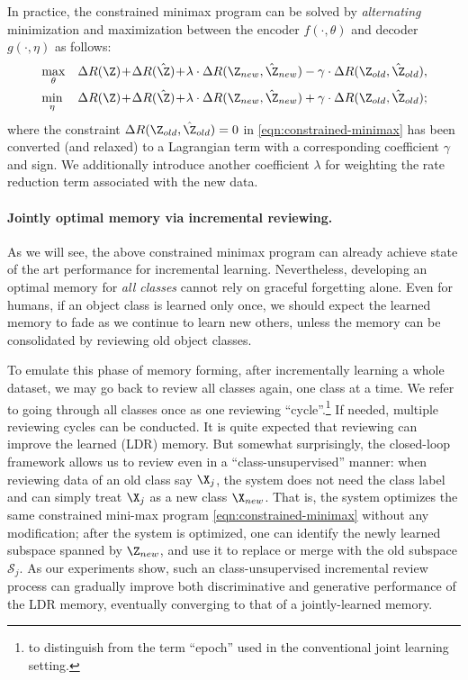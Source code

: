 \documentclass[../../book-main.tex]{subfiles}
\begin{document}
In practice, the constrained minimax program can be solved by {\em alternating}  minimization and maximization between the encoder $f(\cdot, \theta)$ and decoder $g(\cdot, \eta)$ as follows:
\begin{eqnarray}
&\max_\theta  &\Delta{R(\Z)}\!+\!\Delta{R(\hat{\Z})}\!+\!\lambda\cdot  \Delta{R(\Z_{new},\hat{\Z}_{new})} - \gamma\cdot \Delta{R(\Z_{old},\hat{\Z}_{old})}, \label{eqn:relaxed-max}\\ 
&\min_\eta &\Delta{R(\Z)}\!+\!\Delta{R(\hat{\Z})}\!+\!\lambda\cdot \Delta{R(\Z_{new},\hat{\Z}_{new})} + \gamma\cdot \Delta{R(\Z_{old},\hat{\Z}_{old})}; \label{eqn:relaxed-min}
\end{eqnarray}
where the constraint $\Delta R(\Z_{old},\hat{\Z}_{old}) = 0$ in \eqref{eqn:constrained-minimax} has been converted (and relaxed) to a Lagrangian term with a corresponding coefficient $\gamma$ and sign. We additionally introduce another coefficient $\lambda$ for weighting the rate reduction term associated with the new data. %



\paragraph{Jointly optimal memory via incremental reviewing.} 
As we will see, the above constrained minimax program can already achieve state of the art performance for incremental learning. Nevertheless, developing an optimal memory for {\em all classes} cannot rely on graceful forgetting alone. Even for humans, if an object class is learned only once, we should expect the learned memory to fade as we continue to learn new others, unless the memory can be consolidated by reviewing old object classes. %

To emulate this phase of memory forming, after incrementally learning a whole dataset, we may go back to review all classes again, one class at a time. We refer to going through all classes once as one reviewing ``cycle''.\footnote{to distinguish from the term ``epoch'' used in the conventional joint learning setting.} If needed, multiple reviewing cycles can be conducted. It is quite expected that reviewing can improve the learned (LDR) memory. But somewhat surprisingly, the closed-loop framework allows us to review even in a ``{class-unsupervised}'' manner: when reviewing data of an old class say $\X_j$, the system does not need the class label and can simply treat $\X_j$ as a new class $\X_{new}$. That is, the system optimizes the same constrained mini-max program \eqref{eqn:constrained-minimax} without any modification; after the system is optimized, one can identify the newly learned subspace spanned by $\Z_{new}$, and use it to replace or merge with the old subspace $\mathcal{S}_j$. As our experiments show, such an class-unsupervised incremental review process can gradually improve both discriminative and generative performance of the LDR memory, eventually converging to that of a jointly-learned memory.
\end{document}
